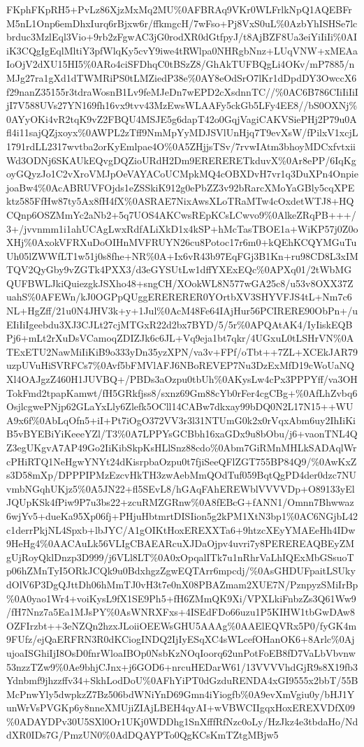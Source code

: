 \documentclass[]{article}
\begin{document}
FKphFKpRH5+PvLz86XjzMxMq2MU\%0AFBRAq9VKr0WLFrlkNpQ1AQEBFrM5nL1Onp6emDhxIurq6rBjxw6r/ffkmgcH/7wFso+Pj8VxS0uL\%0AzbYhISHSe7lcbrduc3MzlEql3Vio+9rb2zFgwAC3jG0rodXR0dGtfpyJ/t8AjBZF8Ua3eiYiIiIi\%0AIiK3CQgIgEqlMltiY3pfWlqKy5cvY9iwe4tRWlpa0NHRgbNnz+LUqVNW+xMEAaIoOjV2dXU15HI5\%0ARo4ciSFDhqC0tBSzZ8/GhAkTUFBQgLi4OKv/mP7885/nMJg27ra1gXd1dTWMRiPS0tLMZiedP38e\%0AY8eOdSrO7lKr1dDpdDY3OwccX6f29nanZ35155r3tdraWosnB1Lv9feMJeDn7wEPD2cXsdnnTC//\%0AC6B786CIiIiIiIjI7V588UVs27YN169fh16vx9tvv43MzEwsWLAAFy5ckGb5LFy4EE8//bS0OXNj\%0AYyOKi4vR2tqK9vZ2FBQU4MSJE5g6dapT42o0GqjVagiCAKVSiePHj2P79u0Afl4i11sajQZjxoyx\%0AWPL2zTff9NmMpYyMDJSVlUnHjq7T9evXsW/fPilxV1xcjL1791rdLL2317wvtba2orKyEmlpae4O\%0A5ZHjjsTSv/7rvwIAtm3bhoyMDCxfvtxiiWd3ODNj6SKAUkEQvgDQZioURdH2Dm9ERERERETkduvX\%0Ar8ePP/6IqKgoyGQyzJo1C2vXroVMJpOeVAYACoUCMpkMQ4cOBXDvH7vr1q3DuXPn4OnpiejoaBw4\%0AcABRUVFOjds1eZSSkiK912g0ePbZZ3v92bRarcXMoYaGBly5cqXPEktz585FfHw87ty5Ax8fH4fX\%0ASRAE7NixAwsXLoTRaMTw4cOxdetWTJ8+HQCQnp6OSZMmYc2aNb2+5q7UOS4AKCwsREpKCsLCwvo9\%0AlkeZRqPB+++/3+/jvvnmm1i1ahUCAgLwxRdfALiXkD1x4kSP+hMcTasTBOE1a+WiKP57j0Z0oXHj\%0AxokVFRXuDoOIHnMVFRUYN26cu8Potoc17r6m0+kQEhKCQYMGuTuUh05lZWWfLT1w51j0s8fhe+NR\%0A+Ix6vR43b97EqFGj3B1Kn+ru98CD8L3xIMTQV2QyGby9vZGTk4PXX3/d3eGYSUtLw1dffYXExEQc\%0APXq01/2tWbMGQUFBWLJkiQuiezgkJSXho48+sngCH/XOokWL8N577wGA25c8/u53v8OXX37ZuahS\%0AFEWn/kJ0OGPpQUggERERERER0YOrtbXV3SHYVFJS4tL+Nm7c6NL+HgZff/21u0N4JHV3k+y+1Jul\%0AcM48Fe64IAjHur56PCIRERE90ObPn+/uEIiIiIgeebdu3XJ3CJLt27cjMTGxR22d2bx7BYD/5/5r\%0APQAtAK4/IyIiskEQBPj6+mLt2rXuDsVCamoqZDIZJk6c6JL+Vq9eja1bt7qkr/4UGxuL0tLSHrVN\%0ATExETU2NawMiIiKiB9o333yDn35yzXPN/va3v+FPf/oTbt++7ZL+XCEkJAR79uzpUVuHiSVRFCs7\%0Avf5bFMVlAFJ6NBoREVEP7Nu3DzExMfD19cWoUaNQXl4OAJgzZ460H1JUVBQ+/PBDs3aOzpu0tbUh\%0AKysLw4cPx3PPPYff/va3OHTokFmd2tpapKamwt/fH5GRkfjss8/sxnz69Gm88cYb0rFer4cgCBg+\%0AfLhZvbq6OsjlcgwePNjp62GLaYxLly6Zlefk5OCll14CABw7dkxay99bDQ0N2L17N15++WUA9x6f\%0AbLqOfn5+iI+Pt7iOgO372VV3r3l31NTUmG0k2x0rVqxAbm6uy2IhIiKiB5vBYEBiYiKeeeYZl/T3\%0A7LPPYsGCBbh16xaGDx9u8bObu/j6+vaonTNL4QZ3egUKgvA7AP49Go2IiKibSkpKsHLlSnz88cdo\%0Abm7GiRMnMHLkSADAqlWrcPHiRTQ1NeHgwYNYt24dKisrpbaOzpu0t7fjiSeeQFlZGT755BP84Q9/\%0AwKxZs3D58mXp/DPPPIPMzEzcvHkTH3zwAebMmQOdTuf059BqtQgPD4der0dzc7NUvmbNGqhUKjz5\%0A5JN22+fl5SEvL8/hGAqFAhEREWblVVVVDp+O89133yElJQUpKSk4fPiw9P7u3bs22+zcuRMZGRnw\%0A8fEBcG+fANN1/Omnn7Bhwwaz6wjYv5+dueKa95Xp06fj+PHjuHbtmrtDISIion5g2kPM1XtN3bp1\%0AC6NGjbL42c1derrPkjNL4Spxb+lbJYC/A1gOIKtHoxEREXXTa6+9htzcXEyYMAEeHh4IDw9HeHg4\%0AACAuLk56VLIgCBAEARcuXJDaOjpv4uvri7y8PEREREAQBEyZMgUjRoyQklDnzp3D999/j6VLl8LT\%0A0xOpqalITk7u1nRhrVaLhIQExMbGSsuoTp06hZMnTyI5ORkJCQk9u0BdxhgzZgwEQTArr6mpcdj/\%0AsGHDUFpaitLSUkydOlV6P3DgQJttDh06hMmTJ0vH3t7e0nX08PBAZmam2XUE7N/PznpyzSMiIrBp\%0A0yao1Wr4+voiKysL9fX1SE9Ph5+fH6ZMmQK9Xi/VPXLkiFnbzZs3Q61Ww9/fH7Nnz7a5Ea1MJsPY\%0AsWNRXFxs+4ISEdFDo66uzu1P5KIHW1tbGwDAw8OZFIrzbt++3eNZQn2hzxJLoiiOEEWsGHU5AAAg\%0AAElEQVRx5P0/fyGK4m9FUfz/ejQaERFRN3R0dKCiogINDQ2IjIyESqXC4sWLcefOHanOK6+8Arlc\%0AjujoaISGhiIjI8OsD0fnrWloaIBOp0NsbKzNOqIoorq62unPotFoEB8fD7VaLbVbvnw53nzzTZw9\%0Ae9bhjCJnx+j6GOD6+nrcuHEDarW61/13VVVVhdGjR9s8X19fb3Ydnbmf9jhzzffv34+SkhLodDoU\%0AFhYiPT0dGzduRENDA4xGI9555x2bbT/55BMcPnwYly5dwpkzZ7Bz506bdWNiYnD69Gmn4iYiogfb\%0A9evXmVgiu0y/bHJ1YunWrVsPVGKp6y8nneXMUjiZIAjLBEH4qyAI+wVBWCIIgqxHoxEREXVDfX09\%0ADAYDPv30U5SXl0Or1UKj0WDDhg1SnXfffRfNzc0oLy/HzJkz4e3tbdaHo/NddXR0IDs7G/PmzUN0\%0AdDQAYPTo0QgKCsKmTZtgMBjw5
\end{document}
